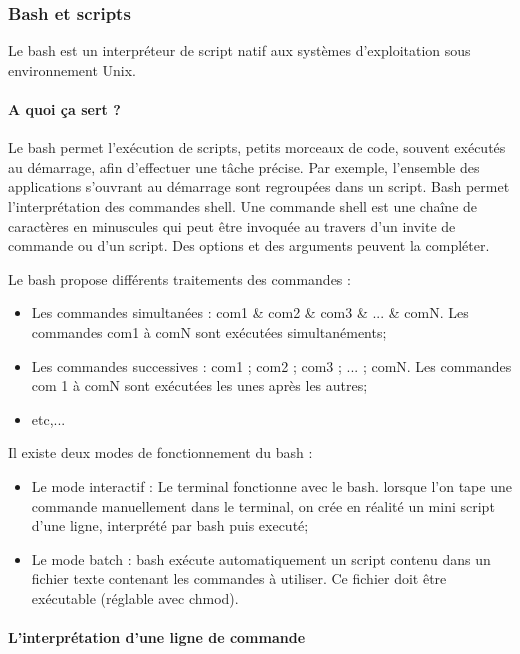 \subsubsection{Bash et scripts}

Le bash est un interpréteur de script natif aux systèmes d'exploitation sous
environnement Unix.

\paragraph{A quoi ça sert ?}

Le bash permet l'exécution de scripts, petits morceaux de code, souvent exécutés
 au démarrage, afin d'effectuer une tâche précise.
Par exemple, l'ensemble des applications s'ouvrant au démarrage sont regroupées
 dans un script. Bash permet l'interprétation des commandes shell.
Une commande shell est une chaîne de caractères en minuscules qui peut être
invoquée au travers d'un invite de commande ou d'un script.
 Des options et des arguments peuvent la compléter.

Le bash propose différents traitements des commandes :
\begin{itemize}
  \item Les commandes simultanées : com1 \& com2 \& com3 \& ... \& comN. Les commandes com1 à comN sont exécutées simultanéments;
  \item Les commandes successives : com1 ; com2 ; com3 ; ... ; comN. Les commandes com 1 à comN sont exécutées les unes après les autres;
  \item etc,...\newline
\end{itemize}

Il existe deux modes de fonctionnement du bash :
\begin{itemize}
  \item Le mode interactif : Le terminal fonctionne avec le bash. lorsque l'on
  tape une commande manuellement dans le terminal, on crée en réalité un mini
  script d'une ligne, interprété par bash puis executé;
  \item Le mode batch : bash exécute automatiquement un script contenu dans un
  fichier texte contenant les commandes à utiliser. Ce fichier doit être
  exécutable (réglable avec chmod).
\end{itemize}


\paragraph{L'interprétation d'une ligne de commande}


